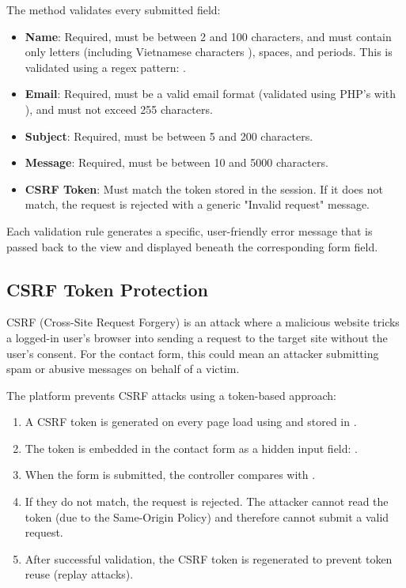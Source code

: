 \documentclass[12pt,a4paper]{report}
\begin{document}
The  method validates every submitted field:

\begin{itemize}
    \item \textbf{Name}: Required, must be between 2 and 100 characters, and must contain only letters (including Vietnamese characters ), spaces, and periods. This is validated using a regex pattern: .
    \item \textbf{Email}: Required, must be a valid email format (validated using PHP's  with ), and must not exceed 255 characters.
    \item \textbf{Subject}: Required, must be between 5 and 200 characters.
    \item \textbf{Message}: Required, must be between 10 and 5000 characters.
    \item \textbf{CSRF Token}: Must match the token stored in the session. If it does not match, the request is rejected with a generic "Invalid request" message.
\end{itemize}

Each validation rule generates a specific, user-friendly error message that is passed back to the view and displayed beneath the corresponding form field.

\subsection{CSRF Token Protection}

CSRF (Cross-Site Request Forgery) is an attack where a malicious website tricks a logged-in user's browser into sending a request to the target site without the user's consent. For the contact form, this could mean an attacker submitting spam or abusive messages on behalf of a victim.

The platform prevents CSRF attacks using a token-based approach:

\begin{enumerate}
    \item A CSRF token is generated on every page load using  and stored in .
    \item The token is embedded in the contact form as a hidden input field: .
    \item When the form is submitted, the controller compares  with .
    \item If they do not match, the request is rejected. The attacker cannot read the token (due to the Same-Origin Policy) and therefore cannot submit a valid request.
    \item After successful validation, the CSRF token is regenerated to prevent token reuse (replay attacks).
\end{enumerate}
\end{document}
